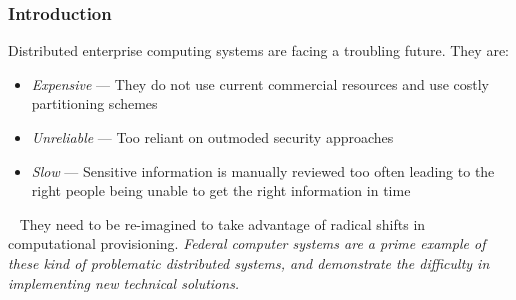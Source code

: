 \begin{frame}
\frametitle{Introduction}
Distributed enterprise computing systems are facing a troubling future.  They are:
\pause
\begin{itemize}
\item \textit{Expensive} --- They do not use current commercial resources and use costly partitioning schemes
\pause
\item \textit{Unreliable} --- Too reliant on outmoded security approaches
\pause
\item \textit{Slow} --- Sensitive information is manually reviewed too often leading to the right people being unable to get the right information in time 
\end{itemize}
\
\newline
\pause
They need to be re-imagined to take advantage of radical shifts in computational provisioning.
\newline
\newline
\pause
\textit{Federal computer systems are a prime example of these kind of problematic distributed systems, and demonstrate the difficulty in implementing new technical solutions.}
\end{frame}